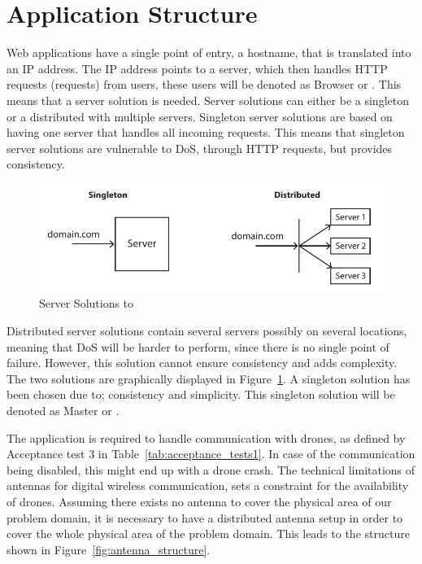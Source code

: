 \section{Application Structure}
\label{sec:application_structure}

Web applications have a single point of entry, a hostname, that is translated into an IP address.
The IP address points to a server, which then handles HTTP requests (requests) from users, these users will be denoted as Browser or .
This means that a server solution is needed.
Server solutions can either be a singleton or a distributed with multiple servers.
Singleton server solutions are based on having one server that handles all incoming requests.
This means that singleton server solutions are vulnerable to DoS, through HTTP requests, but provides consistency.

\begin{figure}[htb]
    \centering
    \includegraphics[width=\textwidth]{gfx/server_solutions.pdf}
    \caption{Server Solutions to \projectname{}}
    \label{fig:server_solutions}
\end{figure}

Distributed server solutions contain several servers possibly on several locations, meaning that DoS will be harder to perform, since there is no single point of failure.
However, this solution cannot ensure consistency and adds complexity.
The two solutions are graphically displayed in Figure~\ref{fig:server_solutions}.
A singleton solution has been chosen due to; consistency and simplicity.
This singleton solution will be denoted as Master or .

The application is required to handle communication with drones, as defined by Acceptance test 3 in Table~\ref{tab:acceptance_tests1}.
In case of the communication being disabled, this might end up with a drone crash.
The technical limitations of antennas for digital wireless communication, sets a constraint for the availability of drones.
Assuming there exists no antenna to cover the physical area of our problem domain, it is necessary to have a distributed antenna setup in order to cover the whole physical area of the problem domain.
This leads to the structure shown in Figure~\ref{fig:antenna_structure}.

